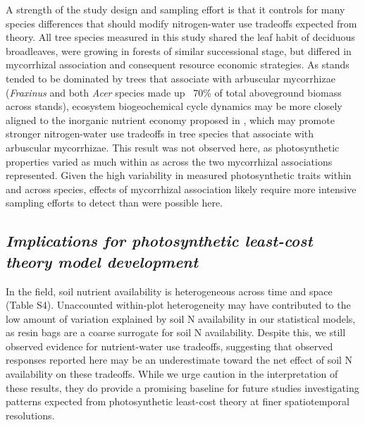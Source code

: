     A strength of the study design and sampling effort is that it controls for many species differences that should modify nitrogen-water use tradeoffs expected from theory. All tree species measured in this study shared the leaf habit of deciduous broadleaves, were growing in forests of similar successional stage, but differed in mycorrhizal association and consequent resource economic strategies. As stands tended to be dominated by trees that associate with arbuscular mycorrhizae (\textit{Fraxinus} and both \textit{Acer} species made up ~70\% of total aboveground biomass across stands), ecosystem biogeochemical cycle dynamics may be more closely aligned to the inorganic nutrient economy proposed in , which may promote stronger nitrogen-water use tradeoffs in tree species that associate with arbuscular mycorrhizae. This result was not observed here, as photosynthetic properties varied as much within as across the two mycorrhizal associations represented. Given the high variability in measured photosynthetic traits within and across species, effects of mycorrhizal association likely require more intensive sampling efforts to detect than were possible here.

    \subsection{\textit{Implications for photosynthetic least-cost theory model development}}

    In the field, soil nutrient availability is heterogeneous across time and space (Table S4). Unaccounted within-plot heterogeneity may have contributed to the low amount of variation explained by soil N availability in our statistical models, as resin bags are a coarse surrogate for soil N availability. Despite this, we still observed evidence for nutrient-water use tradeoffs, suggesting that observed responses reported here may be an underestimate toward the net effect of soil N availability on these tradeoffs. While we urge caution in the interpretation of these results, they do provide a promising baseline for future studies investigating patterns expected from photosynthetic least-cost theory at finer spatiotemporal resolutions.
    
